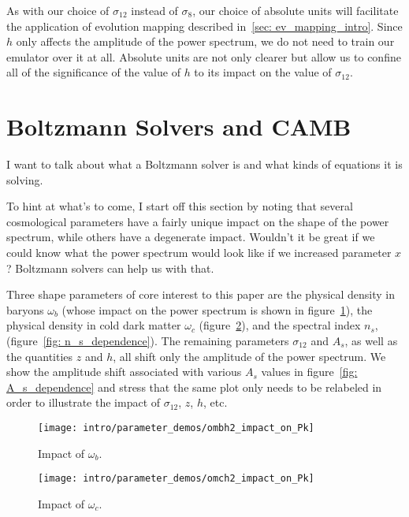 As with our choice of $\sigma_{12}$ instead of $\sigma_8$, our choice of
absolute units will facilitate the application of evolution mapping described
in~\ref{sec: ev_mapping_intro}. Since $h$ only affects the amplitude of the
power spectrum, we do not need to train our emulator over it at all. Absolute 
units are not only clearer but allow us to confine all of the significance of
the value of $h$ to its impact on the value of $\sigma_{12}$.

\section{Boltzmann Solvers and CAMB}
\label{sec: boltzmann_intro}

I want to talk about what a Boltzmann solver is and what kinds of equations it is solving.

To hint at what's to come, I start off this section by noting that several cosmological parameters have a fairly unique impact on the shape of the power spectrum, while others have a degenerate impact. Wouldn't it be great if we could know what the power spectrum would look like if we increased parameter $x$? Boltzmann solvers can help us with that.


Three shape parameters of core interest to this paper are the physical density in baryons $\omega_b$ (whose impact on the power spectrum is shown in figure~\ref{fig: omega_b_dependence}), the physical density in cold dark matter $\omega_c$ (figure~\ref{fig: omega_c_dependence}), and the spectral index $n_s$, (figure~\ref{fig: n_s_dependence}). The remaining parameters $\sigma_{12}$ and $A_s$, as well as the quantities $z$ and $h$, all shift only the amplitude of the power spectrum. We show the amplitude shift associated with various $A_s$ values in figure~\ref{fig: A_s_dependence} and stress that the same plot only needs to be relabeled in order to illustrate the impact of $\sigma_{12}$, $z$, $h$, etc. 

\begin{figure}[htb]
  \centering
  \texttt{[image: intro/parameter\_demos/ombh2\_impact\_on\_Pk]}
  \caption[Impact of $\omega_b$ on $P(k)$]{Impact of $\omega_b$.}
  \label{fig: omega_b_dependence}
\end{figure}

\begin{figure}[htb]
  \centering
  \texttt{[image: intro/parameter\_demos/omch2\_impact\_on\_Pk]}
  \caption[Impact of $\omega_c$ on $P(k)$]{Impact of $\omega_c$.}
  \label{fig: omega_c_dependence}
\end{figure}

